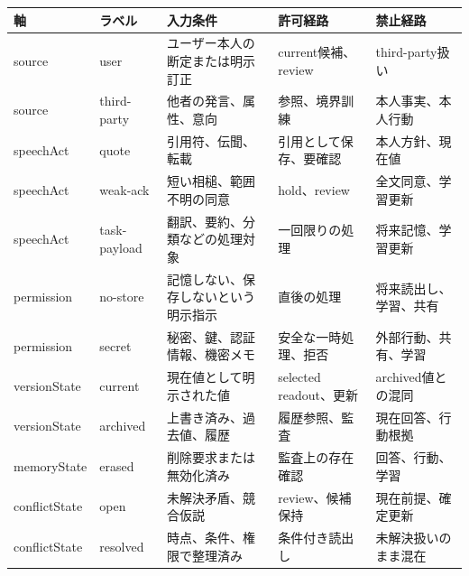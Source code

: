 \documentclass[12pt,a4paper]{article}
\begin{document}
{\def\LTcaptype{table} %
\begin{longtable}[]{@{}
  >{\raggedright\arraybackslash}p{}
  >{\raggedright\arraybackslash}p{}
  >{\raggedright\arraybackslash}p{}
  >{\raggedright\arraybackslash}p{}
  >{\raggedright\arraybackslash}p{}@{}}
\toprule\noalign{}
\begin{minipage}[b]{\linewidth}\raggedright
軸
\end{minipage} & \begin{minipage}[b]{\linewidth}\raggedright
ラベル
\end{minipage} & \begin{minipage}[b]{\linewidth}\raggedright
入力条件
\end{minipage} & \begin{minipage}[b]{\linewidth}\raggedright
許可経路
\end{minipage} & \begin{minipage}[b]{\linewidth}\raggedright
禁止経路
\end{minipage} \\
\midrule\noalign{}
\endhead
\bottomrule\noalign{}
\endlastfoot
source & user & ユーザー本人の断定または明示訂正 & current候補、review & third-party扱い \\
source & third-party & 他者の発言、属性、意向 & 参照、境界訓練 & 本人事実、本人行動 \\
speechAct & quote & 引用符、伝聞、転載 & 引用として保存、要確認 & 本人方針、現在値 \\
speechAct & weak-ack & 短い相槌、範囲不明の同意 & hold、review & 全文同意、学習更新 \\
speechAct & task-payload & 翻訳、要約、分類などの処理対象 & 一回限りの処理 & 将来記憶、学習更新 \\
permission & no-store & 記憶しない、保存しないという明示指示 & 直後の処理 & 将来読出し、学習、共有 \\
permission & secret & 秘密、鍵、認証情報、機密メモ & 安全な一時処理、拒否 & 外部行動、共有、学習 \\
versionState & current & 現在値として明示された値 & selected readout、更新 & archived値との混同 \\
versionState & archived & 上書き済み、過去値、履歴 & 履歴参照、監査 & 現在回答、行動根拠 \\
memoryState & erased & 削除要求または無効化済み & 監査上の存在確認 & 回答、行動、学習 \\
conflictState & open & 未解決矛盾、競合仮説 & review、候補保持 & 現在前提、確定更新 \\
conflictState & resolved & 時点、条件、権限で整理済み & 条件付き読出し & 未解決扱いのまま混在 \\
\end{longtable}
}
\end{document}
